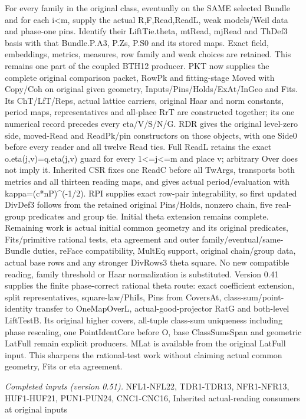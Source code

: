 \documentclass[11pt,a4paper]{article}
\numberwithin{equation}{section}
\theoremstyle{remark}\newtheorem{remark}[theorem]{Remark}
\begin{document}
For every family in the original class, eventually on the SAME selected Bundle and for each i<m, supply the actual R,F,Read,ReadL, weak models/Weil data and phase-one pins. Identify their LiftTie.theta, mtRead, mjRead and ThDef3 basis with that Bundle.P.A3, P.Zs, P.S0 and its stored maps. Exact field, embeddings, metrics, measures, row family and weak choices are retained. This remains one part of the coupled BTH12 producer. PKT now supplies the complete original comparison packet, RowPk and fitting-stage Moved with Copy/Coh on original given geometry, Inputs/Pins/Holds/ExAt/InGeo and Fits. Its ChT/LfT/Reps, actual lattice carriers, original Haar and norm constants, period maps, representatives and all-place RrT are constructed together; its one numerical record precedes every eta/V/S/N/G. RDR gives the original level-zero side, moved-Read and ReadPk/pin constructors on those objects, with one Side0 before every reader and all twelve Read ties. Full ReadL retains the exact o.eta(j,v)=q.eta(j,v) guard for every 1<=j<=m and place v; arbitrary Over does not imply it. Inherited CSR fixes one ReadC before all TwArgs, transports both metrics and all thirteen reading maps, and gives actual period/evaluation with kappa=(c*nP)\textasciicircum{}(-1/2). RPI supplies exact row-pair integrability, so first updated DivDef3 follows from the retained original Pins/Holds, nonzero chain, five real-group predicates and group tie. Initial theta extension remains complete. Remaining work is actual initial common geometry and its original predicates, Fits/primitive rational tests, eta agreement and outer family/eventual/same-Bundle duties, reFace compatibility, MultEq support, original chain/group data, actual base rows and any stronger DivRows3 theta square. No new compatible reading, family threshold or Haar normalization is substituted. Version 0.41 supplies the finite phase-correct rational theta route: exact coefficient extension, split representatives, square-law/PhiIs, Pins from CoversAt, class-sum/point-identity transfer to OneMapOverL, actual-good-projector RatG and both-level LiftTestB. Its original higher covers, all-tuple class-sum uniqueness including phase rescaling, one PointIdentCore before O, base ClassSumsSpan and geometric LatFull remain explicit producers. MLat is available from the original LatFull input. This sharpens the rational-test work without claiming actual common geometry, Fits or eta agreement.

\emph{Completed inputs (version 0.51).} NFL1-NFL22, TDR1-TDR13, NFR1-NFR13, HUF1-HUF21, PUN1-PUN24, CNC1-CNC16, Inherited actual-reading consumers at original inputs
\end{document}
